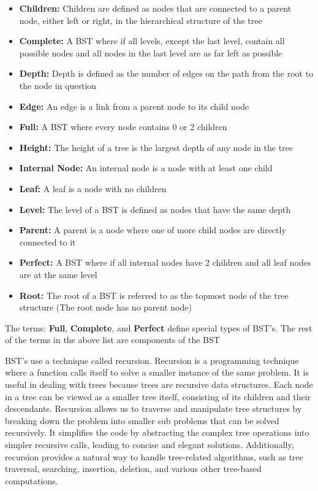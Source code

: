 \begin{itemize}
    \item \textbf{Children:} Children are defined as nodes that are connected to a parent node, either left or right, in the hierarchical structure of the tree
    \item \textbf{Complete:} A BST where if all levels, except the last level, contain all possible nodes and all nodes in the last level are as far left as possible
    \item \textbf{Depth:} Depth is defined as the number of edges on the path from the root to the node in question
    \item \textbf{Edge:} An edge is a link from a parent node to its child node
    \item \textbf{Full:} A BST where every node contains 0 or 2 children
    \item \textbf{Height:} The height of a tree is the largest depth of any node in the tree
    \item \textbf{Internal Node:} An internal node is a node with at least one child
    \item \textbf{Leaf:} A leaf is a node with no children
    \item \textbf{Level:} The level of a BST is defined as nodes that have the same depth
    \item \textbf{Parent:} A parent is a node where one of more child nodes are directly connected to it
    \item \textbf{Perfect:} A BST where if all internal nodes have 2 children and all leaf nodes are at the same level
    \item \textbf{Root:} The root of a BST is referred to as the topmost node of the tree structure (The root node has no parent node)
\end{itemize}

\noindent The terms: \textbf{Full}, \textbf{Complete}, and \textbf{Perfect} define special types of BST's. The rest of the terms in the above list are components of the BST

BST's use a technique called recursion. Recursion is a programming technique where a function calls itself to solve a smaller instance of the same problem. It is useful in dealing with trees because trees are 
recursive data structures. Each node in a tree can be viewed as a smaller tree itself, consisting of its children and their descendants. Recursion allows us to traverse and manipulate tree structures by breaking 
down the problem into smaller sub problems that can be solved recursively. It simplifies the code by abstracting the complex tree operations into simpler recursive calls, leading to concise and elegant solutions. 
Additionally, recursion provides a natural way to handle tree-related algorithms, such as tree traversal, searching, insertion, deletion, and various other tree-based computations.

